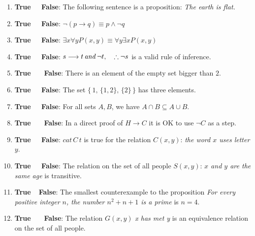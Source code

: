 \documentclass[11pt]{amsart}
\begin{document}
\vskip 10pt
\begin{enumerate}
\item {\bf {\color{red}True} \ \  False}: The following sentence is a proposition: {\itshape The earth is flat.} 

\vfill

\item  {\bf {\color{red}True} \ \  False}: $\neg(p\longrightarrow q) \equiv p\land\neg q$

\vfill
 
 \item  {\bf True \ \  {\color{red}False}}: $\exists{x}\forall{y} P(x,y) \equiv \forall{y}\exists{x}P(x,y)$ 
 
\vfill
  
\item  {\bf {\color{red}True} \ \  False}: $s\longrightarrow t\, {\it and }\,   \neg t, \quad \therefore \neg s$ is a valid rule of inference. 

\vfill

\item  {\bf True \ \ {\color{red} False}}: There is an element of the empty set bigger than $2$.
 
 \vfill
 
\item  {\bf {\color{red}True} \ \  False}: The set $\{\,1,\, \{1,2\},\, \{2\}\,\}$ has three elements.

\vfill
 
\item  {\bf {\color{red}True} \ \  False}: For all sets $A,B$, we have  $A\cap B\subseteq A\cup B$.

\vfill
 
\item  {\bf True \ \ {\color{red} False}}: In a direct proof of $H\longrightarrow C$ it is OK to use $\neg C$ as a step. 
  
\vfill
  
\item  {\bf {\color{red}True} \ \  False}: $cat\,C\,t$ is true for the  relation  $C(x,y)$: {\it the word $x$ uses letter $y$}.
 
 \vfill
 
\item  {\bf {\color{red}True} \ \  False}: The relation on the set of all people 
\vskip -1pt\hskip 70pt $S(x,y)$: {\it $x$ and  $y$ are the same age}
\vskip -1pt\hskip 70pt is transitive.

\vfill

\item  {\bf {\color{red}True}\ \  False}: The smallest counterexample to the proposition
 \vskip -1pt\hskip 70pt {\it For every positive integer $n$, the number $n^2+n+1$ is a prime} 
\vskip -1pt\hskip 70pt  is $n=4.$\vfill

\item {\bf True \ \ {\color{red} False}}: The relation $G(x,y)$ {\it x has met y} is an equivalence
\vskip -1pt\hskip 70pt relation on the set of all people.
 
 \end{enumerate}
 \vfill
 \break
 
\end{document}
